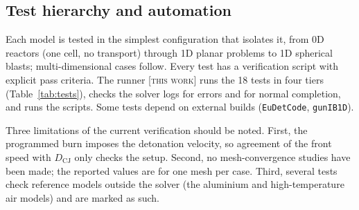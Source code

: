 \documentclass{article}
\newcommand{\tw}{\textsc{[this work]}}
\begin{document}
\subsection{Test hierarchy and automation}

Each model is tested in the simplest configuration that isolates it, from 0D reactors (one cell, no transport) through 1D planar problems to 1D spherical blasts; multi-dimensional cases follow. Every test has a verification script with explicit pass criteria. The runner  \tw{} runs the 18 tests in four tiers (Table~\ref{tab:tests}), checks the solver logs for errors and for normal completion, and runs the scripts. Some tests depend on external builds (\texttt{EuDetCode}, \texttt{gunIB1D}).

Three limitations of the current verification should be noted. First, the programmed burn imposes the detonation velocity, so agreement of the front speed with $D_\text{CJ}$ only checks the setup. Second, no mesh-convergence studies have been made; the reported values are for one mesh per case. Third, several tests check reference models outside the solver (the aluminium and high-temperature air models) and are marked as such.
\end{document}
